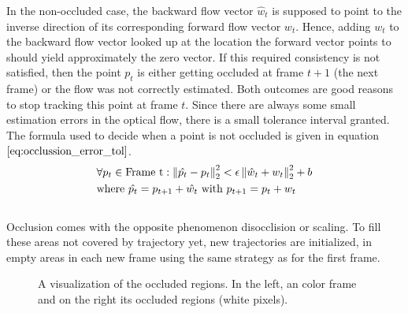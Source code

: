 In the non-occluded case, the backward flow vector $\hat{w}_t$ is supposed to point to the inverse direction of its corresponding forward flow vector $w_t$. Hence, adding $w_t$ to the backward flow vector looked up at the location the forward vector points to should yield approximately the zero vector. If this required consistency is not satisfied, then the point $p_t$ is either getting occluded at frame $t+1$ (the next frame) or the flow was not correctly estimated. Both outcomes are good reasons to stop tracking this point at frame $t$. Since there are always some small estimation errors in the optical flow, there is a small tolerance interval granted. The formula used to decide when a point is not occluded is given in equation $\ref{eq:occlussion_error_tol}$.
\begin{equation}
\begin{aligned}
& \forall p_t \in \text{Frame t}:	\left\lVert\hat{p_t}-p_t\right\rVert_2^2 < \epsilon \left\lVert\hat{w}_t + w_t\right\rVert_2^2 + b \\
& \text{where } \hat{p_t} = p_{t+1} + \hat{w_t} \text{ with } p_{t+1} = p_t + w_t
\end{aligned}
\label{eq:occlussion_error_tol}
\end{equation} \\
Occlusion comes with the opposite phenomenon disocclision or scaling. To fill these areas not covered by trajectory yet, new trajectories are initialized, in empty areas in each new frame using the same strategy as for the first frame.
\begin{figure}[H]
\begin{center}
\end{center}
\caption[Occluded Regions]{A visualization of the occluded regions. In the left, an color frame and on the right its occluded regions (white pixels).}
\label{fig:invalid_regions}
\end{figure}

